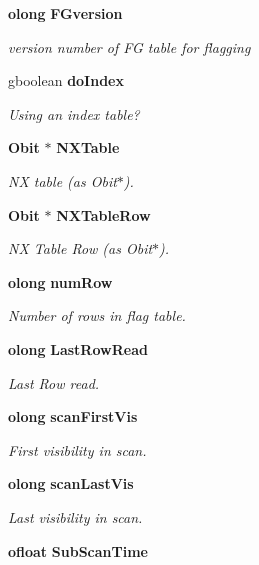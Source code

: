 \begin{CompactItemize}
{\bf olong} {\bf FGversion}
\begin{CompactList}\small\item\em version number of FG table for flagging \item\end{CompactList}\item 
gboolean {\bf do\-Index}
\begin{CompactList}\small\item\em Using an index table? \item\end{CompactList}\item 
{\bf Obit} $\ast$ {\bf NXTable}
\begin{CompactList}\small\item\em NX table (as Obit$\ast$). \item\end{CompactList}\item 
{\bf Obit} $\ast$ {\bf NXTable\-Row}
\begin{CompactList}\small\item\em NX Table Row (as Obit$\ast$). \item\end{CompactList}\item 
{\bf olong} {\bf num\-Row}
\begin{CompactList}\small\item\em Number of rows in flag table. \item\end{CompactList}\item 
{\bf olong} {\bf Last\-Row\-Read}
\begin{CompactList}\small\item\em Last Row read. \item\end{CompactList}\item 
{\bf olong} {\bf scan\-First\-Vis}
\begin{CompactList}\small\item\em First visibility in scan. \item\end{CompactList}\item 
{\bf olong} {\bf scan\-Last\-Vis}
\begin{CompactList}\small\item\em Last visibility in scan. \item\end{CompactList}\item 
{\bf ofloat} {\bf Sub\-Scan\-Time}

\end{CompactItemize}
